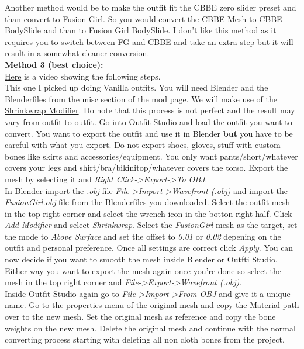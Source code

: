 Another method would be to make the outfit fit the CBBE zero slider preset and than convert to Fusion Girl. So you would convert the 
CBBE Mesh to CBBE BodySlide and than to Fusion Girl BodySlide. I don't like this method as it requires you to switch between FG and CBBE 
and take an extra step but it will result in a somewhat cleaner conversion.\\
\textbf{Method 3 (best choice):}\\
\href{https://drive.google.com/uc?export=download&id=1LNknq-uvtHyA-E1qz5QXfkxsCuPgLoSv}{Here} is a video showing the following steps.\\
This one I picked up doing Vanilla outfits. You will need Blender and the Blenderfiles from the misc section of the mod page. We will make use of the 
\href{https://docs.blender.org/manual/en/latest/modeling/modifiers/deform/shrinkwrap.html}{Shrinkwrap Modifier}. Do note that this 
process is not perfect and the result may vary from outfit to outfit. Go into Outfit Studio and load the outfit you want to convert.
You want to export the outfit and use it in Blender \textbf{but} you have to be careful with what you export. Do not export shoes, gloves, 
stuff with custom bones like skirts and accessories/equipment. You only want pants/short/whatever covers your legs and shirt/bra/bikinitop/whatever covers the torso.
Export the mesh by selecting it and \textit{Right Click->Export->To OBJ}.\\
In Blender import the \textit{.obj} file \textit{File->Import->Wavefront (.obj)} and import the \textit{FusionGirl.obj} file from 
the Blenderfiles you downloaded. Select the outfit mesh in the top right corner and select the wrench icon in the botton right half.
Click \textit{Add Modifier} and select \textit{Shrinkwrap}. Select the \textit{FusionGirl} mesh as the target, set the mode to \textit{Above Surface} 
and set the offset to \textit{0.01} or \textit{0.02} depening on the outfit and personal preference. Once all settings are correct click \textit{Apply}.
You can now decide if you want to smooth the mesh inside Blender or Outfti Studio. Either way you want to export the mesh again once you're done 
so select the mesh in the top right corner and \textit{File->Export->Wavefront (.obj)}.\\
Inside Outfit Studio again go to \textit{File->Import->From OBJ} and give it a unique name. Go to the properties menu of the original mesh 
and copy the Material path over to the new mesh. Set the original mesh as reference and copy the bone weights on the new mesh. Delete the 
original mesh and continue with the normal converting process starting with deleting all non cloth bones from the project.
